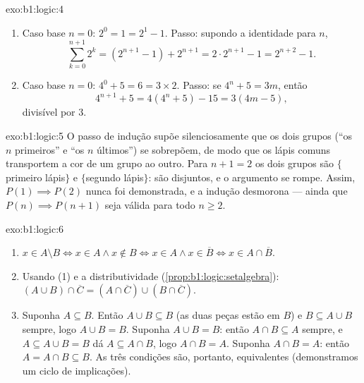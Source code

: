 \begin{solution}{exo:b1:logic:4}
\begin{enumerate}
  \item Caso base $n = 0$: $2^0 = 1 = 2^1 - 1$. Passo: supondo a
        identidade para $n$,
        \[
        \sum_{k=0}^{n+1} 2^k = (2^{n+1} - 1) + 2^{n+1}
        = 2 \cdot 2^{n+1} - 1 = 2^{n+2} - 1 .
        \]
  \item Caso base $n = 0$: $4^0 + 5 = 6 = 3 \times 2$. Passo: se
        $4^n + 5 = 3m$, então
        \[
        4^{n+1} + 5 = 4(4^n + 5) - 15 = 3(4m - 5),
        \]
        divisível por $3$.
\end{enumerate}
\end{solution}

\begin{solution}{exo:b1:logic:5}
O passo de indução supõe silenciosamente que os dois grupos (``os $n$
primeiros'' e ``os $n$ últimos'') se sobrepõem, de modo que os lápis
comuns transportem a cor de um grupo ao outro. Para $n + 1 = 2$ os dois
grupos são $\{$primeiro lápis$\}$ e $\{$segundo lápis$\}$: são disjuntos,
e o argumento se rompe. Assim, $P(1) \implies P(2)$ nunca foi demonstrada, e
a indução desmorona --- ainda que $P(n) \implies P(n+1)$ seja
válida para todo $n \geq 2$.
\end{solution}

\begin{solution}{exo:b1:logic:6}
\begin{enumerate}
  \item $x \in A \setminus B \iff x \in A \land x \notin B \iff x \in
        A \land x \in \overline{B} \iff x \in A \cap \overline{B}$.
  \item Usando (1) e a distributividade
        (\cref{prop:b1:logic:setalgebra}):
        $(A \cup B) \cap \overline{C} = (A \cap \overline{C}) \cup
        (B \cap \overline{C})$.
  \item Suponha $A \subseteq B$. Então $A \cup B \subseteq B$ (as duas
        peças estão em $B$) e $B \subseteq A \cup B$ sempre, logo
        $A \cup B = B$. Suponha $A \cup B = B$: então $A \cap B
        \subseteq A$ sempre, e $A \subseteq A \cup B = B$ dá
        $A \subseteq A \cap B$, logo $A \cap B = A$. Suponha $A \cap B =
        A$: então $A = A \cap B \subseteq B$. As três condições são,
        portanto, equivalentes (demonstramos um ciclo de implicações).
\end{enumerate}
\end{solution}

